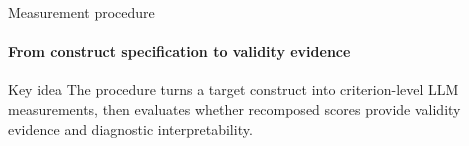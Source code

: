 \begin{frame}{Measurement procedure}
\framesubtitle{From construct specification to validity evidence}

\centering
\resizebox{0.96\textwidth}{!}{%
    
}

\vspace{0.25cm}

\begin{block}{Key idea}
The procedure turns a target construct into criterion-level LLM measurements, then evaluates whether recomposed scores provide validity evidence and diagnostic interpretability.
\end{block}


\end{frame}